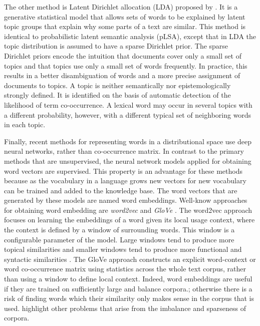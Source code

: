 The other method is Latent Dirichlet allocation (LDA) proposed by . 
It is a generative statistical model that allows sets of words to be explained by latent topic groups that explain why some parts of a text are similar. 
This method is identical to probabilistic latent semantic analysis (pLSA), except that in LDA the topic distribution is assumed to have a sparse Dirichlet prior.
The sparse Dirichlet priors encode the intuition that documents cover only a small set of topics and that topics use only a small set of words frequently. 
In practice, this results in a better disambiguation of words and a more precise assignment of documents to topics.
A topic is neither semantically nor epistemologically strongly defined. 
It is identified on the basis of automatic detection of the likelihood of term co-occurrence. 
A lexical word may occur in several topics with a different probability, however, with a different typical set of neighboring words in each topic.

Finally, recent methods for representing words in a distributional space use deep neural networks, rather than co-occurrence matrix. 
In contrast to the primary methods that are unsupervised, the neural network models applied for obtaining word vectors are supervised.  
This property is an advantage for these methods because as the vocabulary in a language grows new vectors for new vocabulary can be trained and added to the knowledge base. 
The word vectors that are generated by these models are named word embeddings. 
Well-know approaches for obtaining word embedding are \emph{word2vec}  \cite{mikolov13} and \emph{GloVe} \cite{pennington14}. 
The word2vec approach focuses on learning the embeddings of a word given its local usage context, where the context is defined by a window of surrounding words. 
This window is a configurable parameter of the model. 
Large windows tend to produce more topical similarities and smaller windows tend to produce more functional and syntactic similarities \cite{goldberg17}. 
The GloVe approach constructs an explicit word-context or word co-occurrence matrix using statistics across the whole text corpus, rather than using a window to define local context. 
Indeed, word embeddings are useful if they are trained on sufficiently large and balance corpora.; otherwise there is a risk \cite{lindekang98b} of finding words which their similarity only makes sense in the corpus that is used. 
 highlight other problems that arise from the imbalance and sparseness of corpora.

